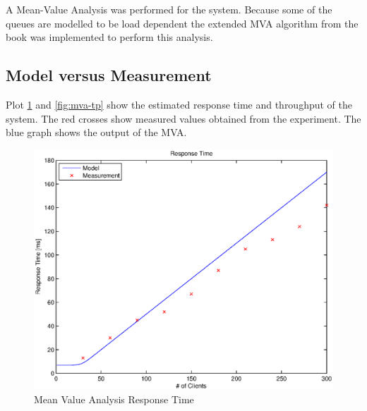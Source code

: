 \documentclass[a4paper]{article}
\begin{document}
A Mean-Value Analysis was performed for the system. Because some of the queues are modelled to be load dependent the extended MVA algorithm from the book \cite[Box 36.1]{Raj} was implemented to perform this analysis.

\subsection{Model versus Measurement}
Plot \ref{fig:mva-rt} and \ref{fig:mva-tp} show the estimated response time and throughput of the system. The red crosses show measured values obtained from the experiment. The blue graph shows the output of the MVA.



\begin{figure}[H]
	\begin{center}
    \includegraphics[scale=0.6]{../plots-ms2-mg/mva-rt.eps}
  \end{center}
  \caption{Mean Value Analysis Response Time}
  \label{fig:mva-rt}
\end{figure}


\end{document}
